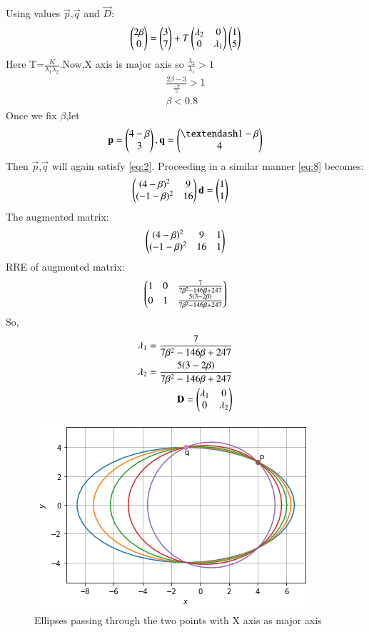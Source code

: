\documentclass[journal,12pt,twocolumn]{IEEEtran}
\begin{document}
Using values $\vec{p}$,$\vec{q}$ and $\vec{D}$:
\begin{align}
   \begin{pmatrix}2\beta\\0\end{pmatrix}=\begin{pmatrix}3\\7\end{pmatrix}+T\begin{pmatrix}\lambda_2 & 0 \\ 0 & \lambda_1\end{pmatrix}\begin{pmatrix}1\\5\end{pmatrix}  
\end{align}
Here T=$\frac{K}{\lambda_1\lambda_2}$.Now,X axis is major axis so 
$\frac{\lambda_2}{\lambda_1}>1$
\begin{align}
    \frac{2\beta-3}{\frac{-7}{5}}>1\\
    \beta<0.8
\end{align}
Once we fix $\beta$,let
\begin{align}
\vec{p} = \myvec{4-\beta\\3} , \vec{q} = \myvec{– 1-\beta\\4}
\end{align}
Then $\vec{p}$,$\vec{q}$ will again satisfy \eqref{eq:2}.
Proceeding in a similar manner \eqref{eq:8} becomes:
\begin{align}
\begin{pmatrix}(4-\beta)^2 & 9\\ (-1-\beta)^2 & 16\end{pmatrix}\mathbf{d} &= \begin{pmatrix}1\\1\end{pmatrix}
\end{align}
The augmented matrix:
\begin{align}
    \begin{pmatrix}(4-\beta)^2 & 9&1\\ (-1-\beta)^2 & 16&1\end{pmatrix}
\end{align}
RRE of augmented matrix:
\begin{align}
    \begin{pmatrix}1&0&\frac{7}{7\beta^2-146\beta+247}\\0&1&\frac{5(3-2\beta)}{7\beta^2-146\beta+247}\end{pmatrix}
\end{align}
So,
\begin{align}
    \lambda_1=\frac{7}{7\beta^2-146\beta+247}\label{eq:18}\\
    \lambda_2=\frac{5(3-2\beta)}{7\beta^2-146\beta+247}\label{eq:19}\\
    \mathbf{D}=\begin{pmatrix}\lambda_1&0\\0&\lambda_2\end{pmatrix}\label{eq:D}
\end{align}


\begin{figure}[!ht]
\centering
\includegraphics[width=\columnwidth]{figure5_1}
\caption{Ellipses passing through the two points with X axis as major axis}
\label{fig:ellipses}	
\end{figure}
\end{document}

